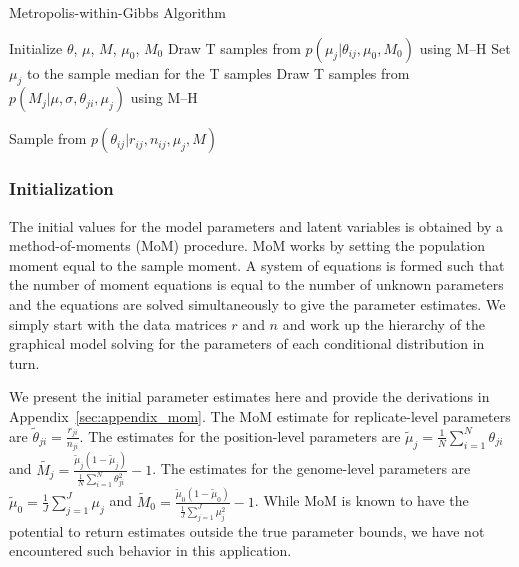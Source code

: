 \documentclass[11pt,reqno]{amsart}
\begin{document}
\begin{algorithm}[ht]
\caption{Metropolis-within-Gibbs Algorithm}
\label{alg:metro_gibbs}
\begin{algorithmic}[1]

\State Initialize $\theta$, $\mu$, $M$, $\mu_0$, $M_0$
\Repeat
{}
  \State Draw T samples from $p \left( \mu_j |\theta_{ij},\mu_0,M_0\right)$ using M--H 
  \State Set $\mu_j$ to the sample median for the T samples
  \State Draw T samples from $p \left( M_{j} |\mu,\sigma, \theta_{ji},\mu_j\right)$ using M--H 

	\State Sample from $p \left( \theta_{ij} |r_{ij},n_{ij},\mu_j,M \right)$  
  \EndFor

\EndFor
{}
\end{algorithmic}
\end{algorithm}

\subsubsection{Initialization}
The initial values for the model parameters and latent variables is obtained by a method-of-moments (MoM) procedure. MoM works by setting the population moment equal to the sample moment. A system of equations is formed such that the number of moment equations is equal to the number of unknown parameters and the equations are solved simultaneously to give the parameter estimates. We simply start with the data matrices $r$ and $n$ and work up the hierarchy of the graphical model solving for the parameters of each conditional distribution in turn.

We present the initial parameter estimates here and provide the derivations in Appendix~\ref{sec:appendix_mom}. The MoM estimate for replicate-level parameters are
$\tilde{\theta}_{ji} = \frac{r_{ji}} {n_{ji}}$.
The estimates for the position-level parameters are
$\tilde{\mu}_j = \frac{1}{N} \sum_{i=1}^N \theta_{ji}$
and
$\tilde{M_j} = \frac{ \tilde{\mu}_j (1 - \tilde{\mu}_j ) } { \frac{1}{N} \sum_{i=1}^N \theta_{ji}^2 } -1$.
The estimates for the genome-level parameters are
$\tilde{\mu}_0 = \frac{1}{J} \sum_{j=1}^J \mu_j$
and
$\tilde{M}_0 = \frac{ \tilde{\mu}_0 (1 - \tilde{\mu}_0 ) } {\frac{1}{J} \sum_{j=1}^J \mu_j^2 } -1$.
While MoM is known to have the potential to return estimates outside the true parameter bounds, we have not encountered such behavior in this application.
\end{document}
